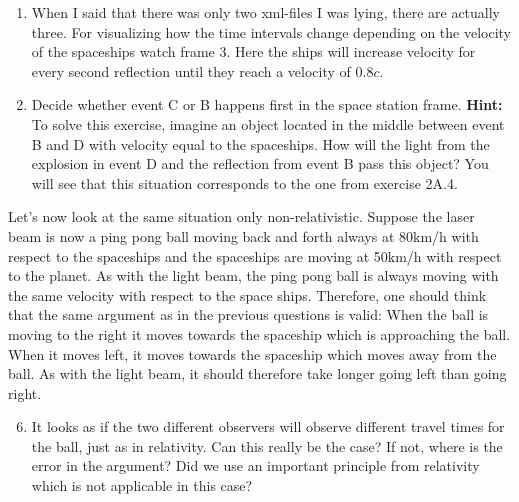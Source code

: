 {\begin{multicols}{2}
\begin{enumerate}
\item When I said that there was only two xml-files I was lying, there are actually three. For visualizing how the time intervals change depending on the velocity of the spaceships watch frame 3. Here the ships will increase velocity for every second reflection until they reach a velocity of $0.8c$.
\item Decide whether event C or B happens first in the space station frame.\newline
\textbf{Hint:} To solve this exercise, imagine an object located in the middle between event B and D with velocity equal to the spaceships. How will the light from the explosion in event D and the reflection from event B pass this object? You will see that this situation corresponds to the one from exercise 2A.4.
\end{enumerate}
Let's now look at the same situation only non-relativistic. Suppose the laser beam is now a ping pong ball moving back and forth always at 80km/h with respect to the spaceships and the spaceships are moving at 50km/h with respect to the planet. As with the light beam, the ping pong ball is always moving with the same velocity with respect to the space ships. Therefore, one should think that the same argument as in the previous questions is valid: When the ball is moving to the right it moves towards the spaceship which is approaching the ball. When it moves left, it moves towards the spaceship which moves away from the ball. As with the light beam, it should therefore take longer going left than going right.
\begin{enumerate}
\setcounter{enumi}{5}
\item It looks as if the two different observers will observe different travel times for the ball, just as in relativity. Can this really be the case? If not, where is the error in the argument? Did we use an important principle from relativity which is not applicable in this case?


\end{enumerate}
\end{multicols}}
